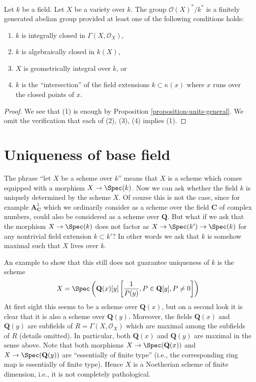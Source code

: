 \begin{lemma}
\label{lemma-units-variety}
Let $k$ be a field.
Let $X$ be a variety over $k$.
The group $\mathcal{O}(X)^*/k^*$ is a finitely generated abelian group
provided at least one of the following conditions holds:
\begin{enumerate}
\item $k$ is integrally closed in $\Gamma(X, \mathcal{O}_X)$,
\item $k$ is algebraically closed in $k(X)$,
\item $X$ is geometrically integral over $k$, or
\item $k$ is the ``intersection'' of the field extensions
$k \subset \kappa(x)$ where $x$ runs over the closed points of $x$.
\end{enumerate}
\end{lemma}

\begin{proof}
We see that (1) is enough by
Proposition \ref{proposition-units-general}.
We omit the verification that each of (2), (3), (4) implies (1).
\end{proof}





\section{Uniqueness of base field}
\label{section-base-field}

\noindent
The phrase ``let $X$ be a scheme over $k$'' means that $X$ is a scheme
which comes equipped with a morphism $X \to \Spec(k)$. Now we can
ask whether the field $k$ is uniquely determined by the scheme $X$.
Of course this is not the case, since for example
$\mathbf{A}^1_{\mathbf{C}}$ which we ordinarily consider as a scheme
over the field $\mathbf{C}$ of complex numbers, could also be considered
as a scheme over $\mathbf{Q}$. But what if we ask that the morphism
$X \to \Spec(k)$ does not factor as
$X \to \Spec(k') \to \Spec(k)$ for any nontrivial field
extension $k \subset k'$? In other words we ask that $k$ is
somehow maximal such that $X$ lives over $k$.

\medskip\noindent
An example to show that this still does not guarantee uniqueness of $k$
is the scheme
$$
X =
\Spec\left(
\mathbf{Q}(x)[y]\left[\frac{1}{P(y)}, P \in \mathbf{Q}[y], P \not = 0\right]
\right)
$$
At first sight this seems to be a scheme over $\mathbf{Q}(x)$, but on a
second look it is clear that it is also a scheme over $\mathbf{Q}(y)$.
Moreover, the fields $\mathbf{Q}(x)$ and $\mathbf{Q}(y)$ are subfields
of $R = \Gamma(X, \mathcal{O}_X)$ which are maximal among the subfields
of $R$ (details omitted). In particular, both $\mathbf{Q}(x)$ and
$\mathbf{Q}(y)$ are maximal in the sense above. Note that both morphisms
$X \to \Spec(\mathbf{Q}(x))$
and $X \to \Spec(\mathbf{Q}(y))$ are ``essentially of finite type''
(i.e., the corresponding ring map is essentially of finite type).
Hence $X$ is a Noetherian scheme of finite dimension, i.e., it is
not completely pathological.

